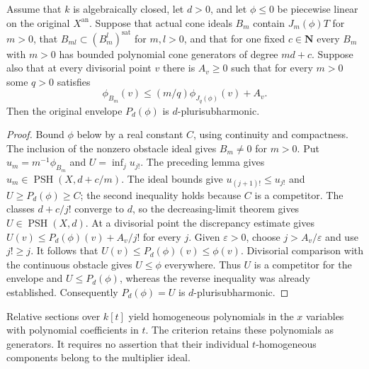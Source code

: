 \begin{theorem}
\label{thm:c0n-polynomial-cone-envelope-assembly}
\leanok
Assume that $k$ is algebraically closed, let $d>0$, and let $\phi\le0$ be
piecewise linear on the original $X^{\mathrm{an}}$.
Suppose that actual cone ideals $B_m$ contain $J_m(\phi)T$ for $m>0$,
that $B_{ml}\subset(B_m^l)^{\mathrm{sat}}$ for $m,l>0$, and that for one
fixed $c\in\mathbf N$ every $B_m$ with $m>0$ has bounded polynomial
cone generators of degree $md+c$.
Suppose also that at every divisorial point $v$ there is $A_v\ge0$ such
that for every $m>0$ some $q>0$ satisfies
\[
 \phi_{B_m}(v)\le(m/q)\phi_{J_q(\phi)}(v)+A_v.
\]
Then the original envelope $P_d(\phi)$ is $d$-plurisubharmonic.
\end{theorem}
\begin{proof}
Bound $\phi$ below by a real constant $C$, using continuity and compactness.
The inclusion of the nonzero obstacle ideal gives $B_m\ne0$ for $m>0$.
Put $u_m=m^{-1}\phi_{B_m}$ and $U=\inf_j u_{j!}$.
The preceding lemma gives $u_m\in\operatorname{PSH}(X,d+c/m)$.
The ideal bounds give $u_{(j+1)!}\le u_{j!}$ and
$U\ge P_d(\phi)\ge C$; the second inequality holds because $C$ is a
competitor.  The classes $d+c/j!$ converge to $d$, so the decreasing-limit
theorem gives $U\in\operatorname{PSH}(X,d)$.
At a divisorial point the discrepancy estimate gives
$U(v)\le P_d(\phi)(v)+A_v/j!$ for every $j$.
Given $\varepsilon>0$, choose $j>A_v/\varepsilon$ and use $j!\ge j$.
It follows that $U(v)\le P_d(\phi)(v)\le\phi(v)$.
Divisorial comparison with the continuous obstacle gives $U\le\phi$
everywhere.  Thus $U$ is a competitor for the envelope and
$U\le P_d(\phi)$, whereas the reverse inequality was already established.
Consequently $P_d(\phi)=U$ is $d$-plurisubharmonic.
\end{proof}

\begin{remark}
Relative sections over $k[t]$ yield homogeneous polynomials in the $x$
variables with polynomial coefficients in $t$.  The criterion retains
these polynomials as generators.  It requires no assertion that their
individual $t$-homogeneous components belong to the multiplier ideal.
\end{remark}
